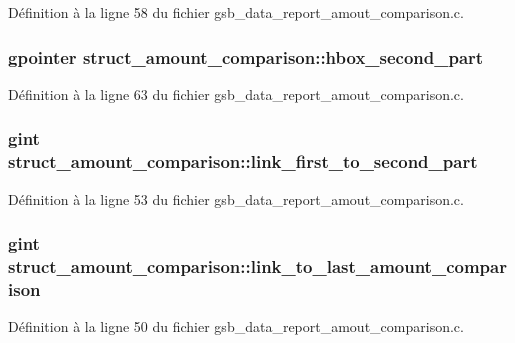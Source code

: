 Définition à la ligne 58 du fichier gsb\_\-data\_\-report\_\-amout\_\-comparison.c.

\subsubsection[{hbox\_\-second\_\-part}]{\setlength{\rightskip}{0pt plus 5cm}gpointer {\bf struct\_\-amount\_\-comparison::hbox\_\-second\_\-part}}\label{structstruct__amount__comparison_a706f8d9c273af7ea6ee4e5b8e940df38}


Définition à la ligne 63 du fichier gsb\_\-data\_\-report\_\-amout\_\-comparison.c.

\subsubsection[{link\_\-first\_\-to\_\-second\_\-part}]{\setlength{\rightskip}{0pt plus 5cm}gint {\bf struct\_\-amount\_\-comparison::link\_\-first\_\-to\_\-second\_\-part}}\label{structstruct__amount__comparison_aa969cfeaa182a29ef1d57ca952452b91}


Définition à la ligne 53 du fichier gsb\_\-data\_\-report\_\-amout\_\-comparison.c.

\subsubsection[{link\_\-to\_\-last\_\-amount\_\-comparison}]{\setlength{\rightskip}{0pt plus 5cm}gint {\bf struct\_\-amount\_\-comparison::link\_\-to\_\-last\_\-amount\_\-comparison}}\label{structstruct__amount__comparison_abf5ad17c7dbe1accee91fe2153a1d0f9}


Définition à la ligne 50 du fichier gsb\_\-data\_\-report\_\-amout\_\-comparison.c.

